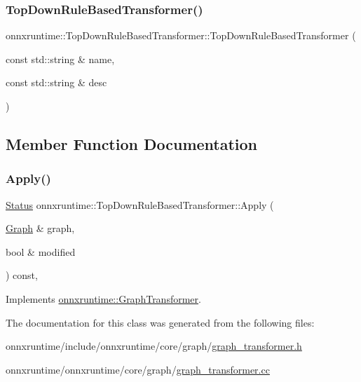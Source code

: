 \subsubsection{\texorpdfstring{Top\+Down\+Rule\+Based\+Transformer()}{TopDownRuleBasedTransformer()}}
{\footnotesize\ttfamily onnxruntime\+::\+Top\+Down\+Rule\+Based\+Transformer\+::\+Top\+Down\+Rule\+Based\+Transformer (\begin{DoxyParamCaption}\item[{const std\+::string \&}]{name,  }\item[{const std\+::string \&}]{desc }\end{DoxyParamCaption})\hspace{0.3cm}{\ttfamily [inline]}}



\subsection{Member Function Documentation}
\mbox{\label{classonnxruntime_1_1TopDownRuleBasedTransformer_ae7604b4ac9da64b2bcae450b4759f624}} 
\subsubsection{\texorpdfstring{Apply()}{Apply()}}
{\footnotesize\ttfamily \mbox{\hyperlink{classonnxruntime_1_1common_1_1Status}{Status}} onnxruntime\+::\+Top\+Down\+Rule\+Based\+Transformer\+::\+Apply (\begin{DoxyParamCaption}\item[{\mbox{\hyperlink{classonnxruntime_1_1Graph}{Graph}} \&}]{graph,  }\item[{bool \&}]{modified }\end{DoxyParamCaption}) const\hspace{0.3cm}{\ttfamily [override]}, {\ttfamily [virtual]}}



Implements \mbox{\hyperlink{classonnxruntime_1_1GraphTransformer_a690d351da797884409b1d7aa584e33b5}{onnxruntime\+::\+Graph\+Transformer}}.



The documentation for this class was generated from the following files\+:\begin{DoxyCompactItemize}
\item 
onnxruntime/include/onnxruntime/core/graph/\mbox{\hyperlink{graph__transformer_8h}{graph\+\_\+transformer.\+h}}\item 
onnxruntime/onnxruntime/core/graph/\mbox{\hyperlink{graph__transformer_8cc}{graph\+\_\+transformer.\+cc}}\end{DoxyCompactItemize}
